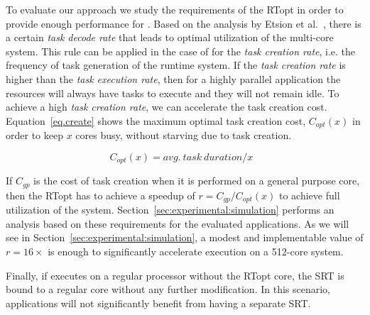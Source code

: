 To evaluate our approach we study the requirements of the RTopt in order to provide enough performance for {\proposal}.
Based on the analysis by Etsion et al.~\cite{TaskSS}, there is a certain \textit{task decode rate} that leads to optimal utilization of the multi-core system.
This rule can be applied in the case of {\proposal} for the \textit{task creation rate}, i.e. the frequency of task generation of the runtime system.
If the \textit{task creation rate} is higher than the \textit{task execution rate}, then for a highly parallel application the resources will always have tasks to execute and they will not remain idle.
To achieve a high \textit{task creation rate}, we can accelerate the task creation cost.
Equation~\ref{eq.create} shows the maximum optimal task creation cost, $C_{opt}(x)$ in order to keep $x$ cores busy, without starving due to task creation.

\begingroup\makeatletter{}\check@mathfonts
\begin{equation}
  \text{$C_{opt}(x) = avg.\ task\ duration / x$ }
\label{eq.create}
\end{equation}
\endgroup

If $C_{gp}$ is the cost of task creation when it is performed on a general purpose core, then the RTopt has to achieve a speedup of $r = C_{gp}/C_{opt}(x)$ to achieve full utilization of the system. 
Section~\ref{sec:experimental:simulation} performs an analysis based on these requirements for the evaluated applications. 
As we will see in Section~\ref{sec:experimental:simulation}, a modest and implementable value of $r=16\times$ is enough to significantly accelerate execution on a 512-core system.

Finally, if {\proposal} executes on a regular processor without the RTopt core, the SRT is bound to a regular core without any further modification. In this scenario, applications will not significantly benefit from having a separate SRT.



